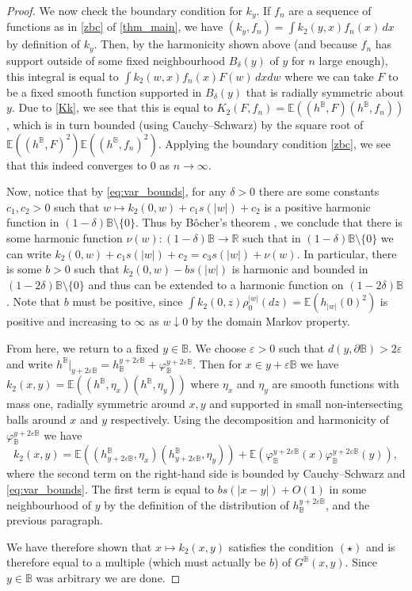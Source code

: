 \documentclass[JEP,XML,SOM,Unicode,published]{cedram}
\theoremstyle{definition}
\newcommand{\R}{\mathbb{R}}
\newcommand{\E}{\mathbb{E}}
\newcommand{\B}{\mathbb{B}}\let\D\B\let\Ub\B
\let\eps\varepsilon
\begin{document}
\begin{proof}
We now check the boundary condition for $k_y$. If $f_n$ are a sequence of functions as in \eqref{zbc} of \cref{thm_main}, we have $(k_y,f_n)=\int k_2(y,x)f_n(x) \, dx$ by definition of $k_y$. Then, by the harmonicity shown above (and because $f_n$ has support outside of some fixed neighbourhood $B_\delta(y)$ of $y$ for $n$ large enough), this integral is equal to $\int k_2(w,x) f_n(x) F(w) \, dx dw$ where we can take $F$ to be a fixed smooth function supported in $B_\delta(y)$ that is radially symmetric about $y$. Due to \eqref{Kk}, we see that this is equal to $K_2(F,f_n)=\E((h^{\B},F)(h^{\B},f_n))$, which is in turn bounded (using Cauchy--Schwarz) by the square root of $\E((h^{\B},F)^2)\E((h^\B,f_n)^2)$. Applying the boundary condition \eqref{zbc}, we see that this indeed converges to $0$ as $n\to \infty$.

Now, notice that by \eqref{eq:var_bounds}, for any $\delta > 0$ there are some constants $c_1, c_2 > 0$ such that $w\mapsto k_2(0,w) + c_1 s(|w|)+c_2$ is a positive harmonic function in \hbox{$(1-\delta)\B \setminus \{0\}$}. Thus by Bôcher's theorem \cite[Chap.\,III]{axlerharm}, we conclude that {there is some harmonic function $\nu(w): (1-\delta)\B \to \R$ such that in $(1-\delta)\B \setminus \{0\}$ we can write $k_2(0,w) + c_1 s(|w|)+c_2 = c_3 s(|w|) + \nu(w)$.} In particular, there is some $b > 0$ such that $k_2(0,w) - bs(|w|)$ is harmonic and bounded in $(1-2\delta)\B\setminus\{0\}$ and thus can be extended to a harmonic function on $(1-2\delta)\B$. Note that $b$ must be positive, since $\int k_2(0,z)\rho_0^{|w|}(dz)=\E(h_{|w|}(0)^2)$ is positive and increasing to $\infty$ as $w \downarrow 0$ by the domain Markov property.

From here, we return to a fixed $y\in \B$. We choose $\eps>0$ such that $d(y,\partial \B)>2\eps$ and write $h^\B|_{y+2\eps\B}=h_\B^{y+2\eps\B}+\varphi_\B^{y+2\eps\B}$. Then for $x\in y+\eps\B$ we have $k_2(x,y)=\E((h^\B,\eta_{x})(h^\B,\eta_{y}))$ where $\eta_x$ and $\eta_y$ are smooth functions with mass one, radially symmetric around $x,y$ and supported in small non-intersecting balls around $x$ and $y$ respectively. Using the decomposition and harmonicity of $\varphi_\B^{y+2\eps\B}$ we have
\[
k_2(x,y)=\E((h^\B_{y+2\eps\B},\eta_x)(h^\B_{y+2\eps\B},\eta_y))+\E(\varphi_\B^{y+2\eps\B}(x)\varphi_\B^{y+2\eps\B}(y)),
\]
where the second term on the right-hand side is bounded by Cauchy--Schwarz and \eqref{eq:var_bounds}. The first term is equal to $bs(|x-y|)+O(1)$ in some neighbourhood of $y$ by the definition of the distribution of $h^{y+2\eps\B}_\B$, and the previous paragraph.

We have therefore shown that $x\mapsto k_2(x,y)$ satisfies the condition $(\star)$ and is therefore equal to a multiple (which must actually be $b$) of $G^\B(x,y)$.
Since $y\in \B$ was arbitrary we are done.
\end{proof}
\end{document}
